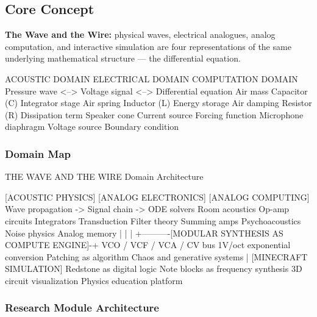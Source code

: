 \documentclass[11pt,letterpaper]{article}
\begin{document}
\subsection{Core Concept}

\textbf{The Wave and the Wire:} physical waves, electrical analogues, analog computation, and interactive simulation are four representations of the same underlying mathematical structure --- the differential equation.

\begin{asciibox}
ACOUSTIC DOMAIN          ELECTRICAL DOMAIN         COMPUTATION DOMAIN
 Pressure wave    <-->   Voltage signal    <-->   Differential equation
 Air mass              Capacitor (C)             Integrator stage
 Air spring            Inductor (L)              Energy storage
 Air damping           Resistor (R)              Dissipation term
 Speaker cone          Current source            Forcing function
 Microphone diaphragm  Voltage source            Boundary condition
\end{asciibox}

\subsubsection{Domain Map}

\begin{asciibox}
                    THE WAVE AND THE WIRE
                    Domain Architecture

  [ACOUSTIC PHYSICS]     [ANALOG ELECTRONICS]    [ANALOG COMPUTING]
    Wave propagation  ->   Signal chain          ->  ODE solvers
    Room acoustics        Op-amp circuits            Integrators
    Transduction          Filter theory              Summing amps
    Psychoacoustics       Noise physics              Analog memory
         |                      |                        |
         +----------[MODULAR SYNTHESIS AS COMPUTE ENGINE]-+
                    VCO / VCF / VCA / CV bus
                    1V/oct exponential conversion
                    Patching as algorithm
                    Chaos and generative systems
                             |
                    [MINECRAFT SIMULATION]
                    Redstone as digital logic
                    Note blocks as frequency synthesis
                    3D circuit visualization
                    Physics education platform
\end{asciibox}

\subsubsection{Research Module Architecture}
\end{document}
